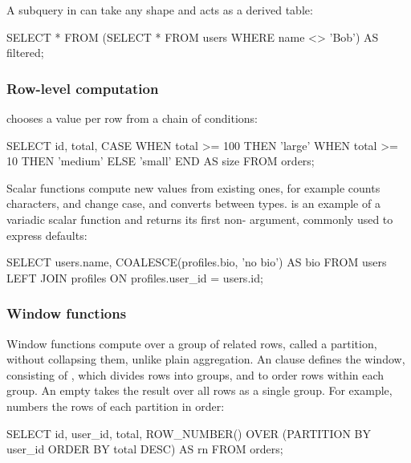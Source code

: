 A subquery in  can take any shape and acts as a derived table:

\begin{sqlblock}
SELECT * FROM (SELECT * FROM users WHERE name <> 'Bob') AS filtered;
\end{sqlblock}

\subsubsection{Row-level computation}

 chooses a value per row from a chain of conditions:

\begin{sqlblock}
SELECT id, total,
       CASE WHEN total >= 100 THEN 'large'
            WHEN total >= 10 THEN 'medium'
            ELSE 'small' END AS size
FROM orders;
\end{sqlblock}

Scalar functions compute new values from existing ones, for example
 counts characters,  and  change case,
and  converts between types.
 is an example of a variadic scalar function and
returns its first non- argument, commonly used to express defaults:

\begin{sqlblock}
SELECT users.name, COALESCE(profiles.bio, 'no bio') AS bio
FROM users
LEFT JOIN profiles ON profiles.user_id = users.id;
\end{sqlblock}

\subsubsection{Window functions}

Window functions compute over a group of related rows,
called a partition, without collapsing them, unlike plain aggregation.
An  clause defines the window,
consisting of , which divides rows into groups,
and  to order rows within each group.
An empty  takes the result over all rows as a single group.
For example,  numbers the rows of each partition in order:

\begin{sqlblock}
SELECT id, user_id, total,
       ROW_NUMBER() OVER (PARTITION BY user_id ORDER BY total DESC) AS rn
FROM orders;
\end{sqlblock}

